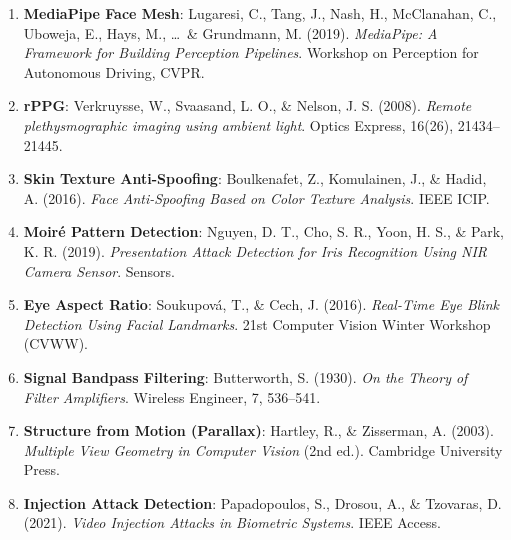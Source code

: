 \documentclass[12pt,a4paper]{report}
\begin{document}
\begin{enumerate}
    \item \textbf{MediaPipe Face Mesh}: Lugaresi, C., Tang, J., Nash, H., McClanahan, C., Uboweja, E., Hays, M., \ldots\ \& Grundmann, M. (2019). \textit{MediaPipe: A Framework for Building Perception Pipelines}. Workshop on Perception for Autonomous Driving, CVPR.

    \item \textbf{rPPG}: Verkruysse, W., Svaasand, L. O., \& Nelson, J. S. (2008). \textit{Remote plethysmographic imaging using ambient light}. Optics Express, 16(26), 21434--21445.

    \item \textbf{Skin Texture Anti-Spoofing}: Boulkenafet, Z., Komulainen, J., \& Hadid, A. (2016). \textit{Face Anti-Spoofing Based on Color Texture Analysis}. IEEE ICIP.

    \item \textbf{Moir\'{e} Pattern Detection}: Nguyen, D. T., Cho, S. R., Yoon, H. S., \& Park, K. R. (2019). \textit{Presentation Attack Detection for Iris Recognition Using NIR Camera Sensor}. Sensors.

    \item \textbf{Eye Aspect Ratio}: Soukupov\'{a}, T., \& Cech, J. (2016). \textit{Real-Time Eye Blink Detection Using Facial Landmarks}. 21st Computer Vision Winter Workshop (CVWW).

    \item \textbf{Signal Bandpass Filtering}: Butterworth, S. (1930). \textit{On the Theory of Filter Amplifiers}. Wireless Engineer, 7, 536--541.

    \item \textbf{Structure from Motion (Parallax)}: Hartley, R., \& Zisserman, A. (2003). \textit{Multiple View Geometry in Computer Vision} (2nd ed.). Cambridge University Press.

    \item \textbf{Injection Attack Detection}: Papadopoulos, S., Drosou, A., \& Tzovaras, D. (2021). \textit{Video Injection Attacks in Biometric Systems}. IEEE Access.
\end{enumerate}
\end{document}
